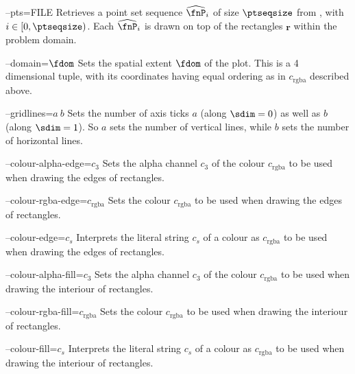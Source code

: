 \begin{procarg}{--pts=FILE}
  Retrieves a point set sequence $\widehat{\fnP}_i$ of size $\ptseqsize$ from , with $i \in [0,\ptseqsize)$. Each $\widehat{\fnP}_i$ is drawn on top of the rectangles $\bm r$ within the problem domain.
\end{procarg}

\begin{procarg}{--domain=$\fdom$}
  Sets the spatial extent $\fdom$ of the plot. This is a 4 dimensional tuple, with its coordinates having equal ordering as in $c_{\text{rgba}}$ described above.
\end{procarg}

\begin{procarg}{--gridlines=$a\ b$}
  Sets the number of axis ticks $a$ (along $\sdim=0$) as well as $b$ (along $\sdim=1$). So $a$ sets the number of vertical lines, while $b$ sets the number of horizontal lines.
\end{procarg}

\begin{procarg}{--colour-alpha-edge=$c_3$}
  Sets the alpha channel $c_3$ of the colour $c_{\text{rgba}}$ to be used when drawing the edges of rectangles.
\end{procarg}

\begin{procarg}{--colour-rgba-edge=$c_{\text{rgba}}$}
  Sets the colour $c_{\text{rgba}}$ to be used when drawing the edges of rectangles.
\end{procarg}

\begin{procarg}{--colour-edge=$c_s$}
  Interprets the literal string $c_s$ of a colour as $c_{\text{rgba}}$ to be used when drawing the edges of rectangles.
\end{procarg}

\begin{procarg}{--colour-alpha-fill=$c_3$}
  Sets the alpha channel $c_3$ of the colour $c_{\text{rgba}}$ to be used when drawing the interiour of rectangles.
\end{procarg}

\begin{procarg}{--colour-rgba-fill=$c_{\text{rgba}}$}
  Sets the colour $c_{\text{rgba}}$ to be used when drawing the interiour of rectangles.
\end{procarg}

\begin{procarg}{--colour-fill=$c_s$}
  Interprets the literal string $c_s$ of a colour as $c_{\text{rgba}}$ to be used when drawing the interiour of rectangles.
\end{procarg}

